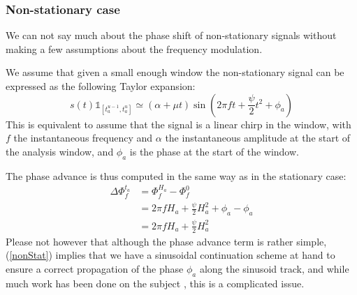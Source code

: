 \documentclass[]{article}
\begin{document}
\subsubsection{Non-stationary case}\label{theoretical_phase_advance_nonstat}
We can not say much about the phase shift of non-stationary signals without making a few assumptions about the frequency modulation.

We assume that given a small enough window the non-stationary signal can be expressed as the following Taylor expansion:
\begin{equation}\label{nonStat}
s(t) \mathds{1}_{[t_a^{u-1}, t_a^u]} \simeq (\alpha + \mu t) \sin(2\pi f t + \frac{\psi}{2} t^2 + \phi_a)
\end{equation}
This is equivalent to assume that the signal is a linear chirp in the window, with $f$ the instantaneous frequency and $\alpha$ the instantaneous amplitude at the start of the analysis window, and $\phi_a$ is the phase at the start of the window.

The phase advance is thus computed in the same way as in the stationary case:
\begin{equation}\label{phaseadvanceNonStat}
\begin{split}
\Delta \Phi_{f}^{t_a} & = \Phi_{f}^{H_a} - \Phi_{f}^{0}\\
& = 2\pi f H_a + \frac{\psi}{2} H_a^2 + \phi_a - \phi_a\\
& = 2\pi f H_a + \frac{\psi}{2}H_a^2
\end{split}
\end{equation}
Please not however that although the phase advance term is rather simple, (\ref{nonStat}) implies that we have a sinusoidal continuation scheme at hand to ensure a correct propagation of the phase $\phi_a$ along the sinusoid track, and while much work has been done on the subject \cite{amatriain2002spectral,karrer2006phavorit}, this is a complicated issue.

\newpage


\end{document}
